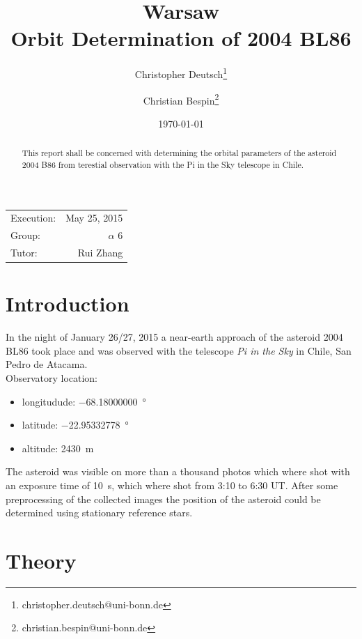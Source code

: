 \documentclass[11pt, a4paper]{article}
\title{Warsaw\\Orbit Determination of 2004 BL86}
\author{Christopher Deutsch\footnote{christopher.deutsch@uni-bonn.de} \and Christian Bespin\footnote{christian.bespin@uni-bonn.de}}
\date{\today}
\numberwithin{equation}{section}
\begin{document}
\begin{titlepage}

\maketitle

\begin{center}
\begin{tabular}{l r}
Execution: & May 25, 2015 \\
Group: & $\alpha$ 6 \\
Tutor: & Rui Zhang
\end{tabular}
\end{center}

\begin{abstract}
\noindent 
This report shall be concerned with determining the orbital parameters of the asteroid 2004 B86 from terestial observation with the Pi in the Sky telescope in Chile.
\end{abstract}

\end{titlepage}

\tableofcontents
\newpage


\section{Introduction}
In the night of January 26/27, 2015 a near-earth approach of the asteroid 2004 BL86 took place and was observed with the telescope \emph{Pi in the Sky} in Chile, San Pedro de Atacama.\\
Observatory location:
\begin{itemize}
	\item longitudude: \SI{-68.18000000}{\degree}
	\item latitude: \SI{-22.95332778}{\degree}
	\item altitude: \SI{2430}{\meter}
\end{itemize}
The asteroid was visible on more than a thousand photos which where shot with an exposure time of \SI{10}{s}, which where shot from 3:10 to 6:30 UT.
After some preprocessing of the collected images the position of the asteroid could be determined using stationary reference stars.

\section{Theory}
\end{document}
